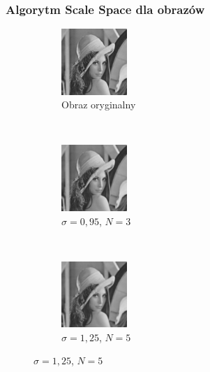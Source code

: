 \begin{frame}
	\frametitle{Algorytm Scale Space dla obrazów}

	\begin{figure}[h]
		\begin{center}
			\begin{subfigure}[b]{3.5cm}
				\centering
				\includegraphics[width=2.5cm]{Lena_scales1.jpg}
				\caption{Obraz oryginalny}
			\end{subfigure}
			~
			\begin{subfigure}[b]{3.5cm}
				\centering
				\includegraphics[width=2.5cm]{Lena_scales2.jpg}
				\caption{$\sigma = 0,95$, $N = 3$}
			\end{subfigure}
			~
			\begin{subfigure}[b]{3.5cm}
				\centering
				\includegraphics[width=2.5cm]{Lena_scales3.jpg}
				\caption{$\sigma = 1,25$, $N = 5$}
			\end{subfigure}



\end{center}
\end{figure}
\end{frame}
